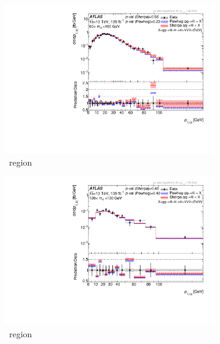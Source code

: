 \begin{figure}[htb!]
    \begin{subfigure}{.49\textwidth}\centering
      \includegraphics[width=.99\linewidth]{Figures/m4l/UnfoldedResults/linlog_Unfolded_Data_pt12_m4l60-100.pdf}\caption{\ZFourL \ region}\label{fig:sub-first}
    \end{subfigure}
    \begin{subfigure}{.49\textwidth}\centering
      \includegraphics[width=.99\linewidth]{Figures/m4l/UnfoldedResults/linlog_Unfolded_Data_pt12_m4l120-130.pdf} \caption{\HFourL \ region}\label{fig:sub-second}
    \end{subfigure}
    \begin{subfigure}{.49\textwidth}\centering

\end{subfigure}
\end{figure}
